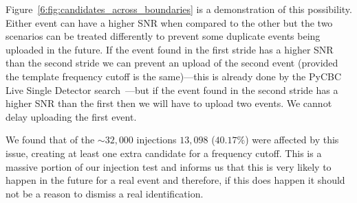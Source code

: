 Figure~\ref{6:fig:candidates_across_boundaries} is a demonstration of this possibility. Either event can have a higher SNR when compared to the other but the two scenarios can be treated differently to prevent some duplicate events being uploaded in the future. If the event found in the first stride has a higher SNR than the second stride we can prevent an upload of the second event (provided the template frequency cutoff is the same)---this is already done by the PyCBC Live Single Detector search~\cite{PyCBC_singles:2022}---but if the event found in the second stride has a higher SNR than the first then we will have to upload two events. We cannot delay uploading the first event.

We found that of the ${\sim}32,000$ injections $13,098$ ($40.17\%$) were affected by this issue, creating at least one extra candidate for a frequency cutoff. This is a massive portion of our injection test and informs us that this is very likely to happen in the future for a real event and therefore, if this does happen it should not be a reason to dismiss a real identification.





